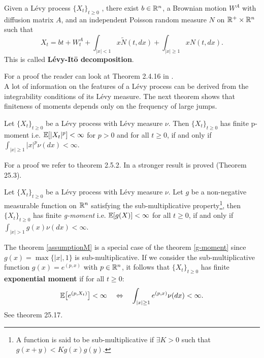 \begin{Theorem}
 Given a Lévy process $\{X_t\}_{t \ge 0}$ , there exist $b\in \mathbb{R}^n$, a Brownian motion $W^A$ with diffusion matrix $A$, and an 
 independent Poisson random measure $N$ on $\mathbb{R}^+ \times \mathbb{R}^n$ such that
 \begin{equation}\label{Levy_Ito}
  X_t = bt + W^A_t + \int_{|x|<1} x \tilde{N}(t,dx) + \int_{|x|\geq1} x N(t,dx).
 \end{equation}
 This is called \textbf{Lévy-It\={o} decomposition}.
\end{Theorem}
 For a proof the reader can look at Theorem 2.4.16 in \cite{Applebaum}.\\
A lot of information on the features of a Lévy process can be derived from the integrability conditions of its Lévy measure. 
The next theorem shows that finiteness of moments depends only on the frequency of large jumps.
\begin{Theorem} \label{assumptionM}
 Let $\{X_t\}_{t \geq 0}$ be a Lévy process with Lévy measure $\nu$. Then
  $\{X_t\}_{t \geq 0}$ has finite p-moment i.e. 
  $\mathbb{E}[|X_t|^p]<\infty$ for $p > 0$ and for all $t\geq0$, if and only if $\int_{|x| \geq 1} |x|^p \nu(dx) <\infty$.
\end{Theorem}
For a proof we refer to \cite{Applebaum} theorem 2.5.2.
In \cite{Sato} a stronger result is proved (Theorem 25.3).
\begin{Theorem}\label{g-moment}
 Let $\{X_t\}_{t \geq 0}$ be a Lévy process with Lévy measure $\nu$.
 Let $g$ be a non-negative measurable function on $\mathbb{R}^n$ satisfying the sub-multiplicative
 property\footnote{A function is said to be sub-multiplicative if $\exists K>0$ such that $g(x+y)<Kg(x)g(y)$.}, 
 then $\{X_t\}_{t \geq 0}$ has finite \emph{g-moment} i.e. $\mathbb{E}[g(X)]<\infty$ for all $t\geq0$, if and only if $\int_{|x| > 1} g(x) \nu(dx) <\infty$.
\end{Theorem}

The theorem \ref{assumptionM} is a special case of the theorem \ref{g-moment} since $g(x) = \max\{ |x|,1 \}$ is sub-multiplicative. 
If we consider the sub-multiplicative function $g(x) = e^{(p,x)}$ with $p\in \mathbb{R}^n$, 
it follows that
$\{X_t\}_{t \geq 0}$ has finite \textbf{exponential moment} if for all $t\geq0$:  
\begin{equation}\label{exp-moment}
\mathbb{E} \bigl[ e^{(p,X_t)} \bigr]<\infty \quad \Leftrightarrow \quad  
 \int_{|x| \geq 1} e^{(p,x)} \nu(dx) <\infty. 
\end{equation}
See \cite{Sato} theorem 25.17.

